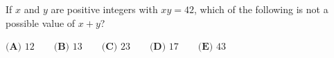 If \(x\) and \(y\) are positive integers with \(xy=42\), which of the following is not a possible value of \(x+y\)?

\(\textbf{(A) } 12 \qquad\textbf{(B) } 13 \qquad\textbf{(C) } 23 \qquad\textbf{(D) } 17 \qquad\textbf{(E) } 43\)
